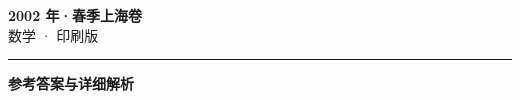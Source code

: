 \documentclass[zihao=5, a4paper]{ctexart}
\begin{document}
\begin{center}
  {\Large\bfseries 2002 年·春季上海卷}\\[4pt]
  {\large 数学 · 印刷版}
\end{center}
\medskip
{}

\par\bigskip\hrule\bigskip
{}
\begin{center}{\large\bfseries 参考答案与详细解析}\end{center}
\smallskip

\end{document}
